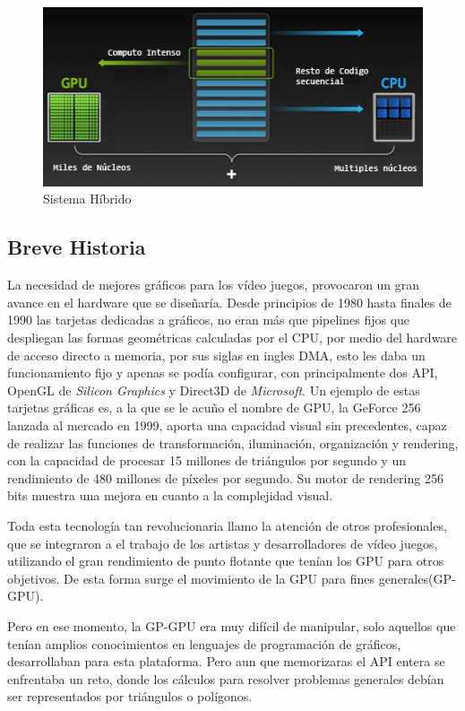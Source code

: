 \begin{figure}[h]
			\centering
				\includegraphics[scale=1]{img/how-gpu-acceleration-works.png}
			\caption{Sistema Híbrido}
\end{figure}

\subsection{Breve Historia}
La necesidad de mejores gráficos para los vídeo juegos, provocaron un gran avance en el hardware que se diseñaría. Desde principios de 1980 hasta finales de 1990 las tarjetas dedicadas a gráficos, no eran más que pipelines fijos que despliegan las formas geométricas calculadas por el CPU, por medio del hardware de acceso directo a memoria, por sus siglas en ingles DMA, esto les daba un funcionamiento fijo y apenas se podía configurar, con principalmente dos API, OpenGL de \textit{Silicon Graphics} y Direct3D de \textit{Microsoft}. Un ejemplo de estas tarjetas gráficas es, a la que se le acuño el nombre de GPU, la GeForce 256\cite{GeForce256} lanzada al mercado en 1999, aporta una capacidad visual sin precedentes, capaz de realizar las funciones de  transformación, iluminación, organización y rendering, con la capacidad de procesar 15 millones de triángulos por segundo y un rendimiento de 480 millones de píxeles por segundo. Su motor de rendering  256 bits muestra una mejora en cuanto a la complejidad visual.

Toda esta tecnología tan revolucionaria llamo la atención de otros profesionales, que se integraron a el trabajo de los artistas y desarrolladores de vídeo juegos, utilizando el gran rendimiento de punto flotante que tenían los GPU para otros objetivos. De esta forma surge el movimiento de la GPU para fines generales(GP-GPU).

Pero en ese momento, la GP-GPU era muy difícil de manipular, solo aquellos que tenían amplios conocimientos en lenguajes de programación de gráficos, desarrollaban para esta plataforma. Pero aun que memorizaras el API entera se enfrentaba un reto, donde los cálculos para resolver problemas generales debían ser representados por triángulos o polígonos.

